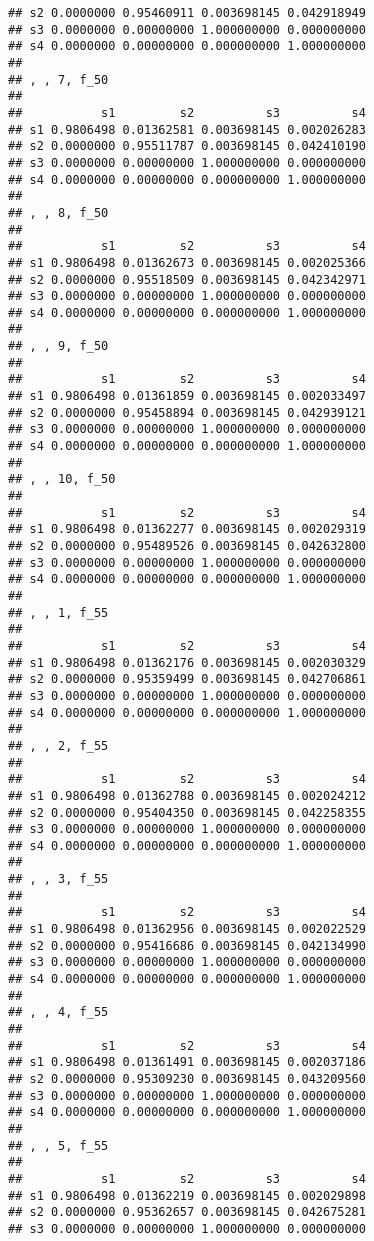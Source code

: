 \documentclass[
]{article}
\begin{document}
\begin{verbatim}
## s2 0.0000000 0.95460911 0.003698145 0.042918949
## s3 0.0000000 0.00000000 1.000000000 0.000000000
## s4 0.0000000 0.00000000 0.000000000 1.000000000
## 
## , , 7, f_50
## 
##           s1         s2          s3          s4
## s1 0.9806498 0.01362581 0.003698145 0.002026283
## s2 0.0000000 0.95511787 0.003698145 0.042410190
## s3 0.0000000 0.00000000 1.000000000 0.000000000
## s4 0.0000000 0.00000000 0.000000000 1.000000000
## 
## , , 8, f_50
## 
##           s1         s2          s3          s4
## s1 0.9806498 0.01362673 0.003698145 0.002025366
## s2 0.0000000 0.95518509 0.003698145 0.042342971
## s3 0.0000000 0.00000000 1.000000000 0.000000000
## s4 0.0000000 0.00000000 0.000000000 1.000000000
## 
## , , 9, f_50
## 
##           s1         s2          s3          s4
## s1 0.9806498 0.01361859 0.003698145 0.002033497
## s2 0.0000000 0.95458894 0.003698145 0.042939121
## s3 0.0000000 0.00000000 1.000000000 0.000000000
## s4 0.0000000 0.00000000 0.000000000 1.000000000
## 
## , , 10, f_50
## 
##           s1         s2          s3          s4
## s1 0.9806498 0.01362277 0.003698145 0.002029319
## s2 0.0000000 0.95489526 0.003698145 0.042632800
## s3 0.0000000 0.00000000 1.000000000 0.000000000
## s4 0.0000000 0.00000000 0.000000000 1.000000000
## 
## , , 1, f_55
## 
##           s1         s2          s3          s4
## s1 0.9806498 0.01362176 0.003698145 0.002030329
## s2 0.0000000 0.95359499 0.003698145 0.042706861
## s3 0.0000000 0.00000000 1.000000000 0.000000000
## s4 0.0000000 0.00000000 0.000000000 1.000000000
## 
## , , 2, f_55
## 
##           s1         s2          s3          s4
## s1 0.9806498 0.01362788 0.003698145 0.002024212
## s2 0.0000000 0.95404350 0.003698145 0.042258355
## s3 0.0000000 0.00000000 1.000000000 0.000000000
## s4 0.0000000 0.00000000 0.000000000 1.000000000
## 
## , , 3, f_55
## 
##           s1         s2          s3          s4
## s1 0.9806498 0.01362956 0.003698145 0.002022529
## s2 0.0000000 0.95416686 0.003698145 0.042134990
## s3 0.0000000 0.00000000 1.000000000 0.000000000
## s4 0.0000000 0.00000000 0.000000000 1.000000000
## 
## , , 4, f_55
## 
##           s1         s2          s3          s4
## s1 0.9806498 0.01361491 0.003698145 0.002037186
## s2 0.0000000 0.95309230 0.003698145 0.043209560
## s3 0.0000000 0.00000000 1.000000000 0.000000000
## s4 0.0000000 0.00000000 0.000000000 1.000000000
## 
## , , 5, f_55
## 
##           s1         s2          s3          s4
## s1 0.9806498 0.01362219 0.003698145 0.002029898
## s2 0.0000000 0.95362657 0.003698145 0.042675281
## s3 0.0000000 0.00000000 1.000000000 0.000000000

\end{verbatim}
\end{document}
